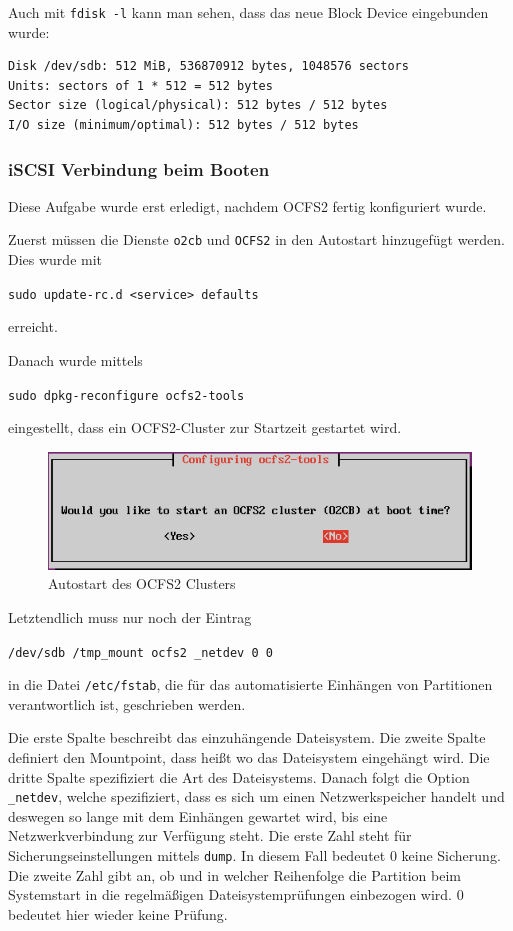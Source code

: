 Auch mit \texttt{fdisk -l} kann man sehen, dass das neue Block Device eingebunden wurde:
\begin{lstlisting}[style=bash, caption=\texttt{fdisk -l}]
Disk /dev/sdb: 512 MiB, 536870912 bytes, 1048576 sectors
Units: sectors of 1 * 512 = 512 bytes
Sector size (logical/physical): 512 bytes / 512 bytes
I/O size (minimum/optimal): 512 bytes / 512 bytes
\end{lstlisting}
\subsubsection{iSCSI Verbindung beim Booten}
Diese Aufgabe wurde erst erledigt, nachdem OCFS2 fertig konfiguriert wurde.

Zuerst müssen die Dienste \texttt{o2cb} und \texttt{OCFS2} in den Autostart hinzugefügt werden. Dies wurde mit 

\texttt{sudo update-rc.d <service> defaults}

erreicht. \cite{updaterc}

Danach wurde mittels

\texttt{sudo dpkg-reconfigure ocfs2-tools}

eingestellt, dass ein OCFS2-Cluster zur Startzeit gestartet wird.\clearpage

\begin{figure}[!h]
	\begin{center}
		\includegraphics[width=0.7\linewidth]{images/boot.png}
		\caption{Autostart des OCFS2 Clusters}
		\label{boot}
	\end{center}
\end{figure}

Letztendlich muss nur noch der Eintrag

\texttt{/dev/sdb	/tmp\_mount	ocfs2	\_netdev		0	0}

in die Datei \texttt{/etc/fstab}, die für das automatisierte Einhängen von Partitionen verantwortlich ist, geschrieben werden. \cite{ocfs2faq}

Die erste Spalte beschreibt das einzuhängende Dateisystem. Die zweite Spalte definiert den Mountpoint, dass heißt wo das Dateisystem eingehängt wird. Die dritte Spalte spezifiziert die Art des Dateisystems. Danach folgt die Option \texttt{\_netdev}, welche spezifiziert, dass es sich um einen Netzwerkspeicher handelt und deswegen so lange mit dem Einhängen gewartet wird, bis eine Netzwerkverbindung zur Verfügung steht. Die erste Zahl steht für Sicherungseinstellungen mittels \texttt{dump}. In diesem Fall bedeutet 0 keine Sicherung. Die zweite Zahl gibt an, ob und in welcher Reihenfolge die Partition beim Systemstart in die regelmäßigen Dateisystemprüfungen einbezogen wird. 0 bedeutet hier wieder keine Prüfung. \cite{ubuntuusersfstab}
